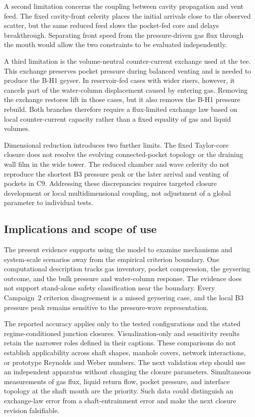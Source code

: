 A second limitation concerns the coupling between cavity propagation and vent
feed. The fixed cavity-front celerity places the initial arrivals close to the
observed scatter, but the same reduced feed slows the pocket-fed core and
delays breakthrough. Separating front speed from the pressure-driven gas flux
through the mouth would allow the two constraints to be evaluated
independently.

A third limitation is the volume-neutral counter-current exchange used at the
tee. This exchange preserves pocket pressure during balanced venting and is
needed to produce the B-H1 geyser. In reservoir-fed cases with wider risers,
however, it cancels part of the water-column displacement caused by entering
gas. Removing the exchange restores lift in those cases, but it also removes
the B-H1 pressure rebuild. Both branches therefore require a flux-limited
exchange law based on local counter-current capacity rather than a fixed
equality of gas and liquid volumes.

Dimensional reduction introduces two further limits. The fixed Taylor-core
closure does not resolve the evolving connected-pocket topology or the
draining wall film in the wide tower. The reduced chamber and wave celerity do
not reproduce the shortest B3 pressure peak or the later arrival and venting
of pockets in C9. Addressing these discrepancies requires targeted closure
development or local multidimensional coupling, not adjustment of a global
parameter to individual tests.

\subsection{Implications and scope of use}

The present evidence supports using the model to examine mechanisms and
system-scale scenarios away from the empirical criterion boundary. One
computational description tracks gas inventory, pocket compression, the
geysering outcome, and the bulk pressure and water-column response. The evidence
does not support stand-alone safety classification near the boundary. Every
Campaign~2 criterion disagreement is a missed geysering case, and the local B3
pressure peak remains sensitive to the pressure-wave representation.

The reported accuracy applies only to the tested configurations and the stated
regime-conditioned junction closures. Visualization-only and sensitivity
results retain the narrower roles defined in their captions. These comparisons
do not establish applicability across shaft shapes, manhole covers, network
interactions, or prototype Reynolds and Weber numbers. The next validation
step should use an independent apparatus without changing the closure
parameters. Simultaneous measurements of gas flux, liquid return flow, pocket
pressure, and interface topology at the shaft mouth are the priority. Such
data could distinguish an exchange-law error from a shaft-entrainment error
and make the next closure revision falsifiable.

